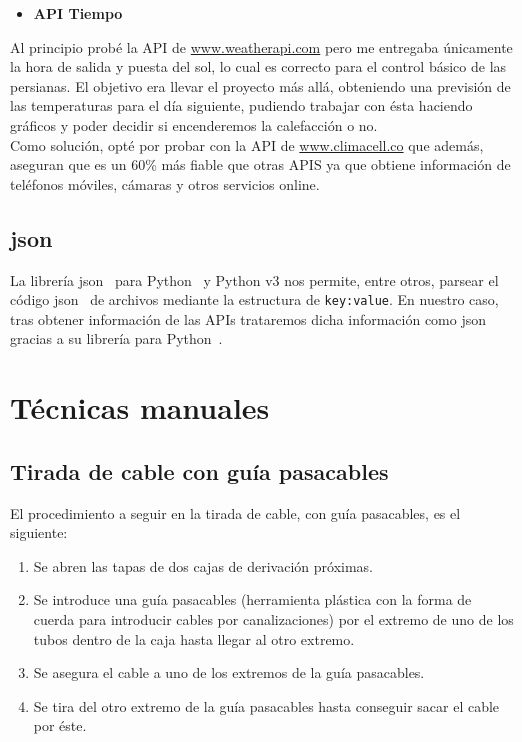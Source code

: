 \begin{itemize}
    \item \textbf{API Tiempo}\label{4:API_Tiempo}
\end{itemize}
Al principio probé la API de \url{www.weatherapi.com} pero me entregaba únicamente la hora de salida y puesta del sol, lo cual es correcto para el control básico de las persianas. El objetivo era llevar el proyecto más allá, obteniendo una previsión de las temperaturas para el día siguiente, pudiendo trabajar con ésta haciendo gráficos y poder decidir si encenderemos la calefacción o no.\\
Como solución, opté por probar con la API de \url{www.climacell.co} que además, aseguran que es un 60\% más fiable que otras APIS ya que obtiene información de teléfonos móviles, cámaras y otros servicios online.

\subsection{json}\label{4:JSON}
La librería json~\cite{misc:Json} para Python~\cite{misc:Python} y Python v3 nos permite, entre otros, parsear el código json~\cite{misc:Json} de archivos mediante la estructura de \texttt{key:value}. En nuestro caso, tras obtener información de las APIs trataremos dicha información como json~\cite{misc:Json} gracias a su librería para Python~\cite{misc:Python}.

\section{Técnicas manuales}

\subsection{Tirada de cable con guía pasacables}\label{4:guiaPasacables}
El procedimiento a seguir en la tirada de cable, con guía pasacables, es el siguiente:
\begin{enumerate}
        \item Se abren las tapas de dos cajas de derivación próximas.
        \item Se introduce una guía pasacables (herramienta plástica con la forma de cuerda para introducir cables por canalizaciones) por el extremo de uno de los tubos dentro de la caja hasta llegar al otro extremo.
        \item Se asegura el cable a uno de los extremos de la guía pasacables.
        \item Se tira del otro extremo de la guía pasacables hasta conseguir sacar el cable por éste.
\end{enumerate}

